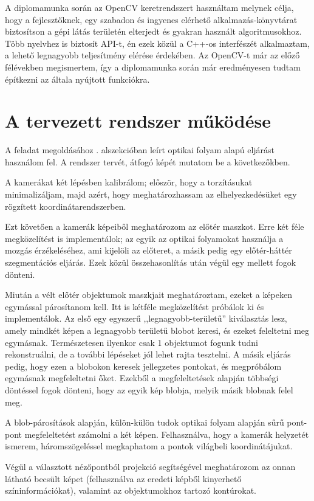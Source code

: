 A diplomamunka során az OpenCV \cite{opencv} keretrendszert használtam melynek célja, hogy a fejlesztőknek, egy szabadon és ingyenes elérhető alkalmazás-könyvtárat biztosítson a gépi látás területén elterjedt és gyakran használt algoritmusokhoz. Több nyelvhez is biztosít API-t, én ezek közül a C++-os interfészét alkalmaztam, a lehető legnagyobb teljesítmény elérése érdekében. Az OpenCV-t már az előző félévekben megismertem, így a diplomamunka során már eredményesen tudtam építkezni az általa nyújtott funkciókra.

\section{A tervezett rendszer működése}

A feladat megoldásához . alszekcióban leírt optikai folyam alapú eljárást használom fel. A rendszer tervét, átfogó képét mutatom be a következőkben.

A kamerákat két lépésben kalibrálom; először, hogy a torzításukat minimalizáljam, majd azért, hogy meghatározhassam az elhelyezkedésüket egy rögzített koordinátarendszerben. 

Ezt követően a kamerák képeiből meghatározom az előtér maszkot. Erre két féle megközelítést is implementálok; az egyik az optikai folyamokat használja a mozgás érzékeléséhez, ami kijelöli az előteret, a másik pedig egy előtér-háttér szegmentációs eljárás. Ezek közül összehasonlítás után végül egy mellett fogok dönteni.

Miután a vélt előtér objektumok maszkjait meghatároztam, ezeket a képeken egymással párosítanom kell. Itt is kétféle megközelítést próbálok ki és implementálok. Az első egy egyszerű ,,legnagyobb-területű'' kiválasztás lesz, amely mindkét képen a legnagyobb területű blobot keresi, és ezeket feleltetni meg egymásnak. Természetesen ilyenkor csak 1 objektumot fogunk tudni rekonstruálni, de a további lépéseket jól lehet rajta tesztelni. A másik eljárás pedig, hogy ezen a blobokon keresek jellegzetes pontokat, és megpróbálom egymásnak megfeleltetni őket. Ezekből a megfeleltetések alapján többségi döntéssel fogok dönteni, hogy az egyik kép blobja, melyik másik blobnak felel meg.

A blob-párosítások alapján, külön-külön tudok optikai folyam alapján sűrű pont-pont megfeleltetést számolni a két képen. Felhasználva, hogy a kamerák helyzetét ismerem, háromszögeléssel megkaphatom a pontok világbeli koordinátájukat. 

Végül a választott nézőpontból projekció segítségével meghatározom az onnan látható becsült képet (felhasználva az eredeti képből kinyerhető színinformációkat), valamint az objektumokhoz tartozó kontúrokat.

